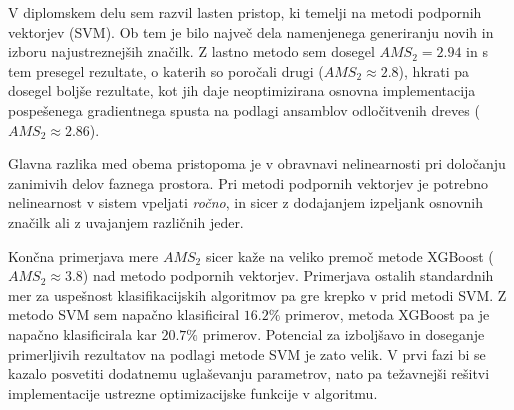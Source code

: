 \documentclass[11pt,a4paper,openany]{book}
\begin{document}
V diplomskem delu sem razvil lasten pristop, ki temelji na metodi podpornih vektorjev (SVM). Ob tem je bilo največ dela namenjenega generiranju novih in izboru najustreznejših značilk. Z lastno metodo sem dosegel $AMS_2 = \num{2,94}$ in s tem presegel rezultate, o katerih so poročali drugi ($AMS_2 \approx \num{2,8}$), hkrati pa dosegel boljše rezultate, kot jih daje neoptimizirana osnovna implementacija pospešenega gradientnega spusta na podlagi ansamblov odločitvenih dreves ($AMS_2 \approx \num{2,86}$).

Glavna razlika med obema pristopoma je v obravnavi nelinearnosti pri določanju zanimivih delov faznega prostora. Pri metodi podpornih vektorjev je potrebno nelinearnost v sistem vpeljati \textit{ročno}, in sicer z dodajanjem izpeljank osnovnih značilk ali z uvajanjem različnih jeder.

Končna primerjava mere $AMS_2$ sicer kaže na veliko premoč metode XGBoost ($AMS_2 \approx \num{3,8}$) nad metodo podpornih vektorjev. Primerjava ostalih standardnih mer za uspešnost klasifikacijskih algoritmov pa gre krepko v prid metodi SVM. Z metodo SVM sem napačno klasificiral $\num{16,2}\%$ primerov, metoda XGBoost pa je napačno klasificirala kar $\num{20,7}\%$ primerov. Potencial za izboljšavo in doseganje primerljivih rezultatov na podlagi metode SVM je zato velik. V prvi fazi bi se kazalo posvetiti dodatnemu uglaševanju parametrov, nato pa težavnejši rešitvi implementacije ustrezne optimizacijske funkcije v algoritmu.




\end{document}
